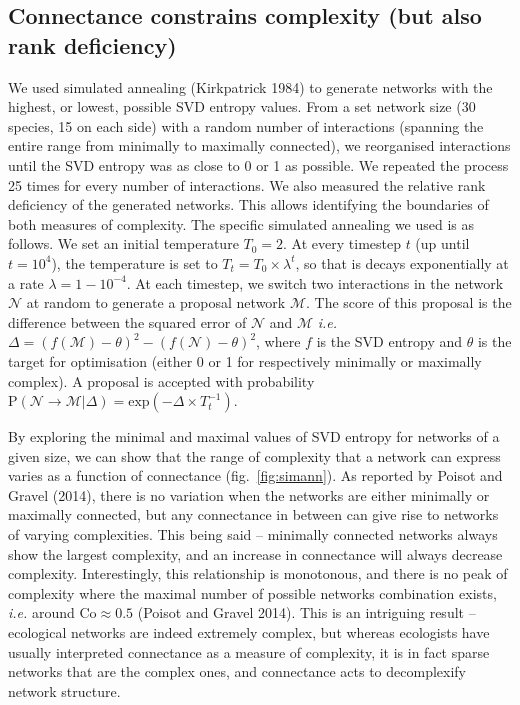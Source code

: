 \documentclass[11pt]{article}
\begin{document}
\hypertarget{connectance-constrains-complexity-but-also-rank-deficiency}{%
\subsection{Connectance constrains complexity (but also rank
deficiency)}\label{connectance-constrains-complexity-but-also-rank-deficiency}}

We used simulated annealing (Kirkpatrick 1984) to generate networks with
the highest, or lowest, possible SVD entropy values. From a set network
size (30 species, 15 on each side) with a random number of interactions
(spanning the entire range from minimally to maximally connected), we
reorganised interactions until the SVD entropy was as close to 0 or 1 as
possible. We repeated the process 25 times for every number of
interactions. We also measured the relative rank deficiency of the
generated networks. This allows identifying the boundaries of both
measures of complexity. The specific simulated annealing we used is as
follows. We set an initial temperature \(T_0 = 2\). At every timestep
\(t\) (up until \(t = 10^4\)), the temperature is set to
\(T_t = T_0\times\lambda^t\), so that is decays exponentially at a rate
\(\lambda = 1 - 10^{-4}\). At each timestep, we switch two interactions
in the network \(\mathcal{N}\) at random to generate a proposal network
\(\mathcal{M}\). The score of this proposal is the difference between
the squared error of \(\mathcal{N}\) and \(\mathcal{M}\) \emph{i.e.}
\(\Delta = (f(\mathcal{M})-\theta)^2-(f(\mathcal{N})-\theta)^2\), where
\(f\) is the SVD entropy and \(\theta\) is the target for optimisation
(either 0 or 1 for respectively minimally or maximally complex). A
proposal is accepted with probability
\(\text{P}(\mathcal{N} \rightarrow \mathcal{M} | \Delta) = \text{exp}\left(-\Delta\times T_t^{-1}\right)\).

By exploring the minimal and maximal values of SVD entropy for networks
of a given size, we can show that the range of complexity that a network
can express varies as a function of connectance (fig.~\ref{fig:simann}).
As reported by Poisot and Gravel (2014), there is no variation when the
networks are either minimally or maximally connected, but any
connectance in between can give rise to networks of varying
complexities. This being said -- minimally connected networks always
show the largest complexity, and an increase in connectance will always
decrease complexity. Interestingly, this relationship is monotonous, and
there is no peak of complexity where the maximal number of possible
networks combination exists, \emph{i.e.} around
\(\text{Co} \approx 0.5\) (Poisot and Gravel 2014). This is an
intriguing result -- ecological networks are indeed extremely complex,
but whereas ecologists have usually interpreted connectance as a measure
of complexity, it is in fact sparse networks that are the complex ones,
and connectance acts to decomplexify network structure.
\end{document}
